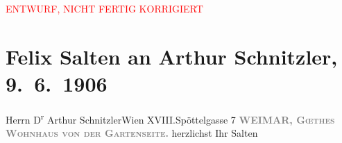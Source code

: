 
\begin{center}
            \textcolor{red}{ENTWURF, NICHT FERTIG KORRIGIERT}
                      \end{center}
            
         \renewcommand{\erwaehnteOrte}{Orte: Edmund-Weiß-Gasse, Goethes Wohnhaus, Weimar, Wien, XVIII., Währing}
         \renewcommand{\erwaehnteWerke}{}
               \section[Felix Salten an Arthur Schnitzler, 9. 6. 1906]{ Felix Salten an Arthur Schnitzler, 9. 6. 1906}\nopagebreak{}\rehead{ }\begin{ledgroupsized}[t]{13cm}\normalsize\beginnumbering \toendnotes[C]{\smallbreak\pagebreak[2]} 
\pstart{}{\pb}Herrn D\textsuperscript{r} Arthur Schnitzler\pend{}\pstart{}Wien XVIII.\pend{}\pstart{}Spöttelgasse 7\pend{}{\bigskip}\pstart
           \noindent{}\centering{}{\pb}\textcolor{gray}{\textbf{WEIMAR, \textsc{Gœthes Wohnhaus von der
                  Gartenseite}.}}\pend
           \pstart
           herzlichst\pend
           \pstart Ihr \spacefill\mbox{Salten}\pend{}
         
         \endnumbering{}\end{ledgroupsized}\begin{anhang}\end{anhang}\newcommand{\dateiname}{L03424}\newcommand{\titel}{Felix Salten an Arthur Schnitzler, 9. 6. 1906}\newcommand{\editorInnen}{Martin Anton Müller und Laura Untner}
      